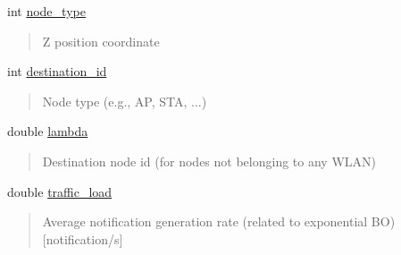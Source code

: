 \begin{DoxyCompactItemize}
\begin{DoxyCompactList}
\end{DoxyCompactList}\item 
\mbox{\label{structCapabilities_a1193f0213dfc1a0efd15eaf65b0ea45c}} 
int \hyperlink{structCapabilities_a1193f0213dfc1a0efd15eaf65b0ea45c}{node\+\_\+type}
\begin{DoxyCompactList}\small\item\em \begin{quote}
Z position coordinate \end{quote}
\end{DoxyCompactList}\item 
\mbox{\label{structCapabilities_ab551c86dab551aa25bd42a5230b456c2}} 
int \hyperlink{structCapabilities_ab551c86dab551aa25bd42a5230b456c2}{destination\+\_\+id}
\begin{DoxyCompactList}\small\item\em \begin{quote}
Node type (e.\+g., AP, S\+TA, ...) \end{quote}
\end{DoxyCompactList}\item 
\mbox{\label{structCapabilities_a7d819ae08c2d5100ae73976f3ad2026e}} 
double \hyperlink{structCapabilities_a7d819ae08c2d5100ae73976f3ad2026e}{lambda}
\begin{DoxyCompactList}\small\item\em \begin{quote}
Destination node id (for nodes not belonging to any W\+L\+AN) \end{quote}
\end{DoxyCompactList}\item 
\mbox{\label{structCapabilities_a8c1dc96e13e54efefbaed6e0218a4e30}} 
double \hyperlink{structCapabilities_a8c1dc96e13e54efefbaed6e0218a4e30}{traffic\+\_\+load}
\begin{DoxyCompactList}\small\item\em \begin{quote}
Average notification generation rate (related to exponential BO) \mbox{[}notification/s\mbox{]} \end{quote}
\end{DoxyCompactList}\item 
\mbox{\label{structCapabilities_a619b798b45dc3bfcb0456b663918e534}} 

\end{DoxyCompactItemize}
